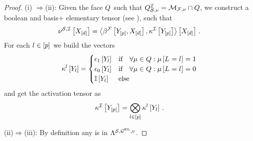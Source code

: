 \begin{proof}
(i)
    $\Rightarrow$(ii):
    Given the face $Q$ such that $Q^{\mathcal{I}}_{\mathcal{S},\nu}=\mathcal{M}_{\mathcal{F},\nu}\cap Q$, we construct a boolean and basis+ elementary tensor (see ), such that
    \begin{align*}
        \nu^{\mathcal{S},\mathcal{I}}\left[X_{[d]}\right]
        = \left\langle \beta^{\mathcal{F}}\left[Y_{[p]},X_{[d]}\right],\kappa^{\mathcal{I}}\left[Y_{[p]}\right]\right\rangle \left[ X_{[d]} \right] \, .
    \end{align*}
    For each $l\in[p]$ we build the vectors
    \begin{align*}
        \kappa^{l}\left[Y_{l}\right]
        = \begin{cases}
              \epsilon_1\left[Y_{l}\right] & \text{if} \quad \forall{\mu\in Q}:{\mu\left[L_{}=l_{}\right]=1} \\
              \epsilon_0\left[Y_{l}\right] & \text{if} \quad \forall{\mu\in Q}:{\mu\left[L_{}=l_{}\right]=0} \\
              \mathbb{I}\left[Y_{l}\right] & \text{else}
        \end{cases}
    \end{align*}
    and get the activation tensor as
    \begin{align*}
        \kappa^{\mathcal{I}}\left[Y_{[p]}\right]
        = \bigotimes_{l\in[p]} \kappa^{l}\left[Y_{l}\right] \, .
    \end{align*}

    (ii)$\Rightarrow$(iii):
    By definition any \HardLogicNetwork{} is in $\Lambda^{\mathcal{S},\mathcal{G}^{\mathrm{EL}},\nu}$.


\end{proof}
